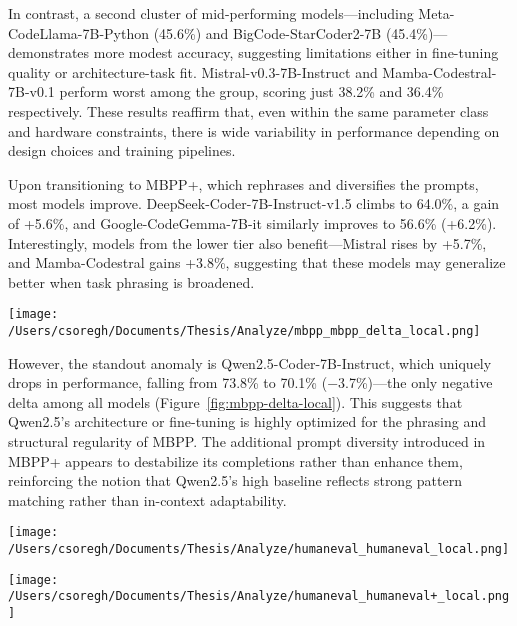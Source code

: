 In contrast, a second cluster of mid-performing models—including Meta-CodeLlama-7B-Python (45.6\%) and BigCode-StarCoder2-7B (45.4\%)—demonstrates more modest accuracy, suggesting limitations either in fine-tuning quality or architecture-task fit. Mistral-v0.3-7B-Instruct and Mamba-Codestral-7B-v0.1 perform worst among the group, scoring just 38.2\% and 36.4\% respectively. These results reaffirm that, even within the same parameter class and hardware constraints, there is wide variability in performance depending on design choices and training pipelines.

Upon transitioning to MBPP+, which rephrases and diversifies the prompts, most models improve. DeepSeek-Coder-7B-Instruct-v1.5 climbs to 64.0\%, a gain of +5.6\%, and Google-CodeGemma-7B-it similarly improves to 56.6\% (+6.2\%). Interestingly, models from the lower tier also benefit—Mistral rises by +5.7\%, and Mamba-Codestral gains +3.8\%, suggesting that these models may generalize better when task phrasing is broadened.

\begin{center}
	\texttt{[image: /Users/csoregh/Documents/Thesis/Analyze/mbpp\_mbpp\_delta\_local.png]}
	\label{fig:mbpp-delta-local}
\end{center}

However, the standout anomaly is Qwen2.5-Coder-7B-Instruct, which uniquely drops in performance, falling from 73.8\% to 70.1\% (−3.7\%)—the only negative delta among all models (Figure~\ref{fig:mbpp-delta-local}). This suggests that Qwen2.5’s architecture or fine-tuning is highly optimized for the phrasing and structural regularity of MBPP. The additional prompt diversity introduced in MBPP+ appears to destabilize its completions rather than enhance them, reinforcing the notion that Qwen2.5’s high baseline reflects strong pattern matching rather than in-context adaptability.

\begin{center}
	\texttt{[image: /Users/csoregh/Documents/Thesis/Analyze/humaneval\_humaneval\_local.png]}
	\label{fig:humaneval-local}
\end{center}

\begin{center}
	\texttt{[image: /Users/csoregh/Documents/Thesis/Analyze/humaneval\_humaneval+\_local.png]}
	\label{fig:humanevalplus-local}
\end{center}

